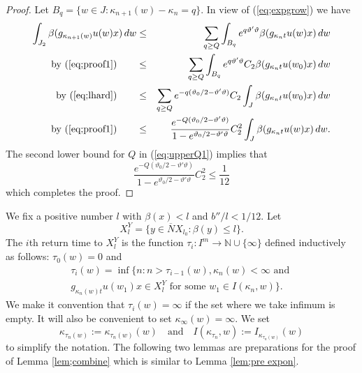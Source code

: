 \documentclass[12pt]{amsart}
\theoremstyle{definition}
\theoremstyle{remark}
\numberwithin{equation}{section}
\begin{document}
\begin{proof}
Let $B_q=\{w\in J: \kappa_{n+1}(w)-\kappa_n=q\}$.
In view of  (\ref{eq;expgrow}) we have
\begin{eqnarray*}
\int_{J_2}\beta (g_{\kappa_{n+1}(w)}u(w)x)\,dw & \le &  
\sum _{q\ge  Q}\int_{B_q}e^{q\vartheta'\vartheta} 
\beta(g_{\kappa_{n}t}u(w)x)\, dw \\
\mbox{by (\ref{eq;proof1})}\qquad& \le &  
\sum _{q\ge  Q}\int_{B_q}e^{q\vartheta'\vartheta} C_2
\beta(g_{\kappa_{n}t}u(w_0)x) \,dw \\
\mbox{by (\ref{eq;lhard})}\qquad
&\le &\sum_{q\ge Q} e^{-q(\vartheta_0/2-\vartheta'\vartheta)}C_2\int_J\beta(g_{\kappa_nt}u(w_0)x)\,dw \\
\mbox{by (\ref{eq;proof1})}\qquad
&\le & \frac{ e^{-Q(\vartheta_0/2-\vartheta'\vartheta)}} {1-e^{\vartheta_0/2-\vartheta'\vartheta}}
C_2^2\int_J\beta(g_{\kappa_nt}u(w)x)\,dw.
\end{eqnarray*}
The second lower bound for   $Q$ in (\ref{eq;upperQ1})  implies that 
\[
\frac{ e^{-Q(\vartheta_0/2-\vartheta'\vartheta)}} {1-e^{\vartheta_0/2-\vartheta'\vartheta}}C_2^2\le \frac{1}{12}
\]
which  completes the proof.
\end{proof}

We fix a positive number $l$ with $\beta(x)<l$ and  $b''/l<1/12$.
 Let  
\begin{equation}\label{eq;similarY}
X^Y_{l}=\{y\in \overline{N} X_{l_0}: \beta(y)\le l\}.
\end{equation}
The  $i$th return time to $X_{l}^Y$  is  the function $\tau_i:I^m\to { \mathbb N}\cup \{\infty\}$ defined
inductively  as follows:
  $\tau_0(w)=0$ and 
 \begin{multline*}
\tau_i(w)=\inf\{n: n>\tau_{i-1}(w) , \kappa_n(w)<\infty
\mbox{ and }  \\
  g_{\kappa_n(w)t}u(w_1)x\in X_{l}^Y   
   \mbox{ for some } w_1\in I(\kappa_n, w)\}.
\end{multline*}
We make it convention that $\tau_i(w)=\infty$ if the set where 
we take  infimum  is empty. 
It will also be convenient to set $\kappa_{\infty}(w)=\infty$. 
We  set \[
 \kappa_{\tau_n(w)}:=\kappa_{\tau_n(w)}(w)
 \quad \mbox{and}\quad 
 I(\kappa_{\tau_n}, w):=I_{\kappa_{\tau_n(w)}}(w)
\]
to simplify the notation.
The following two lemmas are preparations for the proof of Lemma \ref{lem;combine}
which is similar to Lemma \ref{lem;pre expon}.
\end{document}
